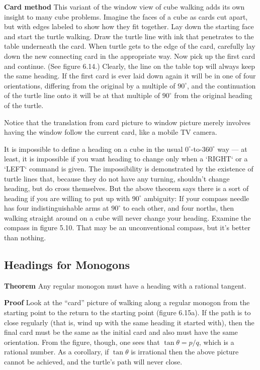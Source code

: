 \documentclass{book}
\begin{document}
\textbf{Card method} This variant of the window view of cube walking adds its
own insight to many cube problems. Imagine the faces of a cube as cards
cut apart, but with edges labeled to show how they fit together. Lay
down the starting face and start the turtle walking. Draw the turtle line
with ink that penetrates to the table underneath the card. When turtle
gets to the edge of the card, carefully lay down the new connecting card
in the appropriate way. Now pick up the first card and continue. (See
figure 6.14.) Clearly, the line on the table top will always keep the same
heading. If the first card is ever laid down again it will be in one of
four orientations, differing from the original by a multiple of $90^{\circ}$, and
the continuation of the turtle line onto it will be at that multiple of $90^{\circ}$
from the original heading of the turtle.

Notice that the translation from card picture to window picture merely
involves having the window follow the current card, like a mobile TV
camera.

It is impossible to define a heading on a cube in the usual $0^{\circ}$-to-$360^{\circ}$
way --- at least, it is impossible if you want heading to change only when
a \textsc{`RIGHT`} or a \textsc{`LEFT`} command is given. The impossibility is demonstrated
by the existence of turtle lines that, because they do not have any
turning, shouldn't change heading, but do cross themselves. But the
above theorem says there is a sort of heading if you are willing to put up
with $90^{\circ}$ ambiguity: If your compass needle has four indistinguishable
arms at $90^{\circ}$ to each other, and four norths, then walking straight around
on a cube will never change your heading. Examine the compass in
figure 5.10. That may be an unconventional compass, but it's better
than nothing.

\subsection{Headings for Monogons}

\textbf{Theorem} Any regular monogon must have a heading with a rational
tangent.

\textbf{Proof} Look at the ``card'' picture of walking along a regular monogon
from the starting point to the return to the starting point (figure 6.15a).
If the path is to close regularly (that is, wind up with the same heading
it started with), then the final card must be the same as the initial card
and also must have the same orientation. From the figure, though, one
sees that $\tan \theta = p / q$, which is a rational number. As a corollary, if
$\tan \theta$ is irrational then the above picture cannot be achieved, and the
turtle's path will never close.
\end{document}
